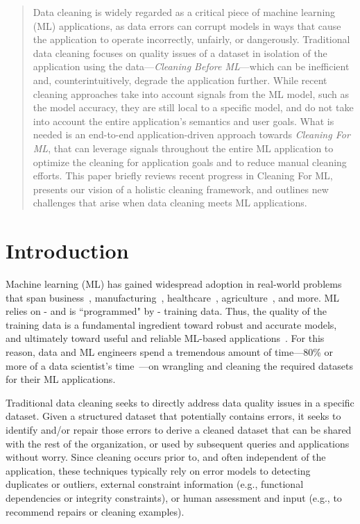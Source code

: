 \documentclass[11pt,dvipsnames]{article}
\begin{document}
\begin{abstract}
  Data cleaning is widely regarded as a critical piece of machine learning (ML) applications, as data errors can corrupt models in ways that cause the application to operate incorrectly, unfairly, or dangerously.  
  Traditional data cleaning focuses on quality issues of a dataset in isolation of the application using the data---{\it Cleaning Before ML}---which can be inefficient and, counterintuitively, degrade the application further.    While recent cleaning approaches take into account signals from the ML model, such as the model accuracy, they are still local to a specific model, and do not take into account the entire application's semantics and user goals.
  What is needed is an end-to-end application-driven approach towards {\it Cleaning For ML}, that can leverage signals throughout the entire ML application to optimize the cleaning for application goals and to reduce manual cleaning efforts.    This paper briefly reviews recent progress in Cleaning For ML, presents our vision of a holistic cleaning framework, and outlines new challenges that arise when data cleaning meets ML applications.

\end{abstract}


\section{Introduction}

Machine learning (ML) has gained widespread adoption in real-world problems that span business~\cite{MLinTrading}, manufacturing~\cite{MLinManufacturing}, healthcare~\cite{CheXpert}, agriculture~\cite{MLinAgriculture}, and more. 
ML relies on - and is ``programmed" by - training data. Thus, the quality of the training data is a fundamental ingredient toward robust and accurate models, and ultimately toward useful and reliable ML-based applications~\cite{CleanML,Tfx,Tay}.  
For this reason, data and ML engineers spend a tremendous amount of time---80\% or more of a data scientist's time~\cite{DataCivilizer,CloudywithhighchanceofDBMS,Kandel2012EnterpriseDA}---on wrangling and cleaning the required datasets for their ML applications. 

Traditional data cleaning seeks to directly address data quality issues in a specific dataset. Given a structured dataset that potentially contains errors, it seeks to identify and/or repair those errors to derive a cleaned dataset that can be shared with the rest of the organization, or used by subsequent queries and applications without worry. Since cleaning occurs prior to, and often independent of the application, these techniques typically rely on error models to detecting duplicates or outliers, external constraint information (e.g., functional dependencies or integrity constraints), or human assessment and input (e.g., to recommend repairs or cleaning examples).  
\end{document}
